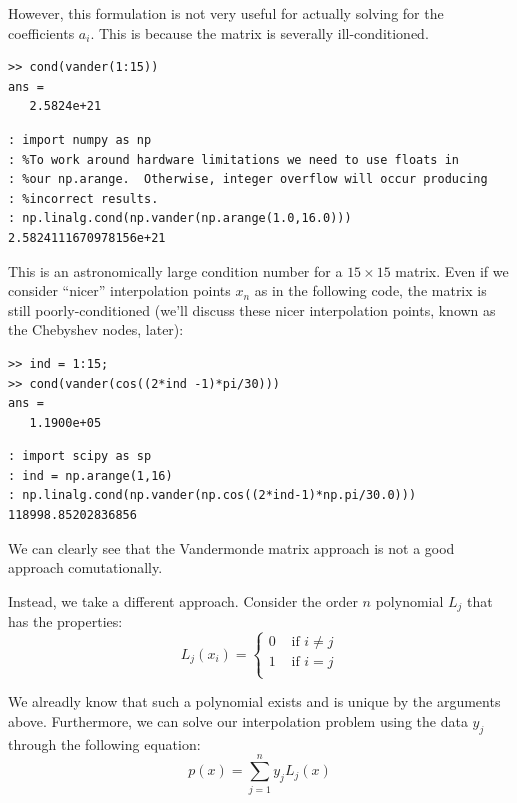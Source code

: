 However, this formulation is not very useful for actually solving for the coefficients $a_i$. This is because the matrix is severally ill-conditioned.

\begin{matlab}
\begin{lstlisting}[style=matlab]
>> cond(vander(1:15))
ans =
   2.5824e+21
\end{lstlisting}
\end{matlab}
\begin{python}
\begin{lstlisting}[style=python]
: import numpy as np
: %To work around hardware limitations we need to use floats in
: %our np.arange.  Otherwise, integer overflow will occur producing
: %incorrect results.
: np.linalg.cond(np.vander(np.arange(1.0,16.0)))
2.5824111670978156e+21
\end{lstlisting}
\end{python}

This is an astronomically large condition number for a $15 \times 15$ matrix. Even if we consider ``nicer'' interpolation points $x_n$ as in the following code, the matrix is still poorly-conditioned (we'll discuss these nicer interpolation points, known as the Chebyshev nodes, later):

\begin{matlab}
\begin{lstlisting}[style=matlab]
>> ind = 1:15;
>> cond(vander(cos((2*ind -1)*pi/30)))
ans =
   1.1900e+05
\end{lstlisting}
\end{matlab}
\begin{python}
\begin{lstlisting}[style=python]
: import scipy as sp
: ind = np.arange(1,16)
: np.linalg.cond(np.vander(np.cos((2*ind-1)*np.pi/30.0)))
118998.85202836856
\end{lstlisting}
\end{python}

We can clearly see that the Vandermonde matrix approach is not a good approach comutationally.

Instead, we take a different approach. Consider the order $n$ polynomial $L_j$ that has the properties:
\[
L_j(x_i) = \begin{cases} 0 &\mbox{ if } i \neq j\\ 1 &\mbox{ if } i =j \\ \end{cases}
\]

We alreadly know that such a polynomial exists and is unique by the arguments above. Furthermore, we can solve our interpolation problem using the data $y_j$ through the following equation:
\[
p(x) = \sum_{j=1}^n y_j L_j(x)
\]

